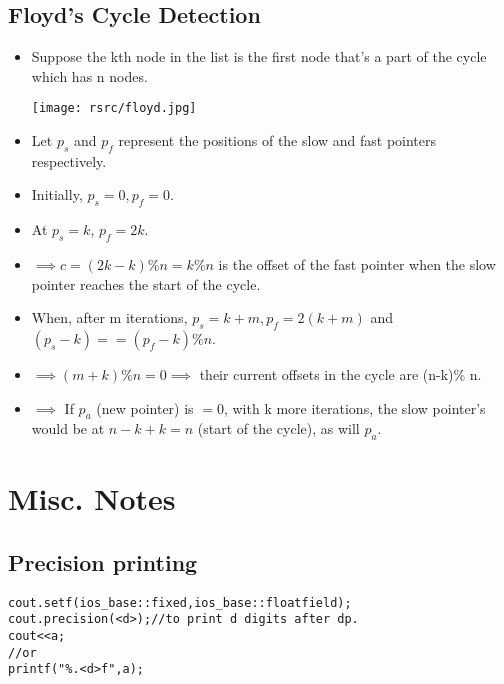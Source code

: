 \documentclass{article}
\begin{document}
\subsection{Floyd's Cycle Detection}
\begin{itemize}
\item Suppose the kth node in the list is the first node that's a part of the cycle which has n nodes.
\begin{center}
\texttt{[image: rsrc/floyd.jpg]}
\end{center}
\item Let $p_s$ and $p_f$ represent the positions of the slow and fast pointers respectively.
\item Initially, $p_s = 0, p_f = 0.$
\item At $p_s = k$, $p_f = 2k$.
\item $\implies c = (2k-k) \% n = k \% n$ is the offset of the fast pointer when the slow pointer reaches the start of the cycle.
\item When, after m iterations, $p_s = k+m, p_f = 2(k+m)$ and $(p_s-k) == (p_f-k) \% n$.
\item $\implies (m + k) \% n = 0 \implies $ their current offsets in the cycle are (n-k)\% n.
\item $\implies $ If $p_a$ (new pointer) is $=0$, with k more iterations, the slow pointer's would be at $n-k + k = n$ (start of the cycle), as will $p_a$.
\end{itemize}
\section*{Misc. Notes}
\subsection*{Precision printing}
\begin{lstlisting}
cout.setf(ios_base::fixed,ios_base::floatfield);
cout.precision(<d>);//to print d digits after dp.
cout<<a;
//or
printf("%.<d>f",a);
\end{lstlisting}
\end{document}
